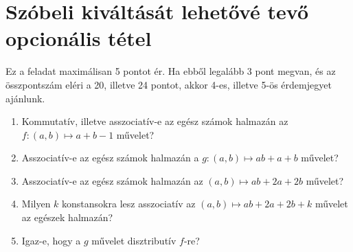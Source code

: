 \documentclass[11pt,a4paper]{article}
\begin{document}
\section{Szóbeli kiváltását lehetővé tevő opcionális tétel}
Ez a feladat maximálisan 5 pontot ér. Ha ebből legalább 3 pont megvan, és az összpontszám eléri a 20, illetve 24 pontot, akkor 4-es, illetve 5-ös érdemjegyet ajánlunk.
\begin{enumerate}

\item Kommutatív, illetve asszociatív-e az egész számok halmazán az $f:(a,b)\mapsto a + b -1$ művelet?
\item Asszociatív-e az egész számok halmazán a $g:(a,b)\mapsto ab + a + b$ művelet?
\item Asszociatív-e az egész számok halmazán az $(a,b)\mapsto ab + 2a + 2b$ művelet?
\item Milyen $k$ konstansokra lesz asszociatív az $(a,b)\mapsto ab + 2a + 2b + k$ művelet az egészek halmazán?
\item Igaz-e, hogy a $g$ művelet disztributív $f$-re?


\end{enumerate}
\end{document}
